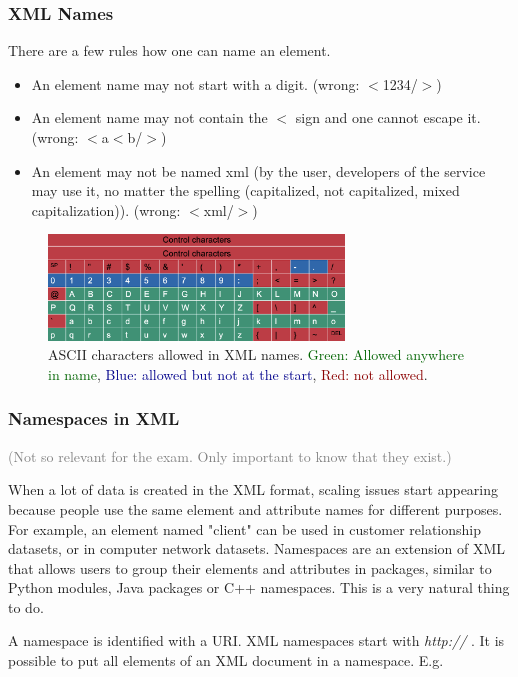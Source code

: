 \subsubsection{XML Names}
There are a few rules how one can name an element.
\begin{itemize}
    \item An element name may not start with a digit. (wrong: $<$1234/$>$)
    \item An element name may not contain the $<$ sign and one cannot escape it. (wrong: $<$a$<$b/$>$)
    \item An element may not be named xml (by the user, developers of the service may use it, no matter the spelling (capitalized, not capitalized, mixed capitalization)). (wrong: $<$xml/$>$)
\end{itemize}

\begin{figure}[h]
    \centering
    \includegraphics[width=0.7\textwidth]{Figures/CharactersAllowed.png}
    \caption{ASCII characters allowed in XML names. \textcolor{darkgreen}{Green: Allowed anywhere in name}, \textcolor{darkblue}{Blue: allowed but not at the start}, \textcolor{darkred}{Red: not allowed}.}\label{fig:charallow}
\end{figure}

\subsubsection{Namespaces in XML}

\textcolor{grey}{(Not so relevant for the exam. Only important to know that they exist.)}

When a lot of data is created in the XML format, scaling issues start appearing because people use the same element and attribute names for different purposes. For example, an element named "client" can be used in customer relationship datasets, or in computer network datasets.
Namespaces are an extension of XML that allows users to group their elements and attributes in packages, similar to Python modules, Java packages or C++ namespaces. This is a very natural thing to do.

A namespace is identified with a URI. XML namespaces start with \textit{http://} . It is possible to put all elements of an XML document in a namespace. E.g.

